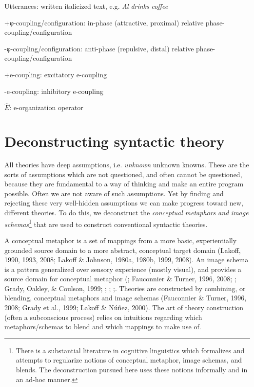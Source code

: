 Utterances: written italicized text, e.g. \textit{Al} \textit{drinks} \textit{coffee}

+φ-coupling/configuration: in-phase (attractive, proximal) relative phase-coupling/configuration

{}-φ-coupling/configuration: anti-phase (repulsive, distal) relative phase-coupling/configuration

+e-coupling: excitatory e-coupling

{}-e-coupling: inhibitory e-coupling

 $\widehat {{E}}$: e-organization operator

\chapter{Deconstructing syntactic theory}

All theories have deep assumptions, i.e. \textit{unknown} unknown knowns. These are the sorts of assumptions which are not questioned, and often cannot be questioned, because they are fundamental to a way of thinking and make an entire program possible. Often we are not aware of such assumptions. Yet by finding and rejecting these very well-hidden assumptions we can make progress toward new, different theories. To do this, we deconstruct the \textit{conceptual} \textit{metaphors} \textit{and} \textit{image} \textit{schemas}\footnote{There is a substantial literature in cognitive linguistics which formalizes and attempts to regularize notions of conceptual metaphor, image schemas, and blends. The deconstruction pursued here uses these notions informally and in an ad-hoc manner.} that are used to construct conventional syntactic theories. 

  A conceptual metaphor is a set of mappings from a more basic, experientially grounded source domain to a more abstract, conceptual target domain (Lakoff, 1990, 1993, 2008; Lakoff \& Johnson, 1980a, 1980b, 1999, 2008). An image schema is a pattern generalized over sensory experience (mostly visual), and provides a source domain for conceptual metaphor (\citealt{ClausnerCroft1999}; Fauconnier \& Turner, 1996, 2008; \citealt{GibbsColston1995}; Grady, Oakley, \& Coulson, 1999; \citealt{Langacker2002}; \citealt{Oakley2007}; \citealt{Talmy1983,Talmy1988};. Theories are constructed by combining, or blending, conceptual metaphors and image schemas (Fauconnier \& Turner, 1996, 2008; Grady et al., 1999; Lakoff \& Núñez, 2000). The art of theory construction (often a subconscious process) relies on intuitions regarding which metaphors/schemas to blend and which mappings to make use of.

